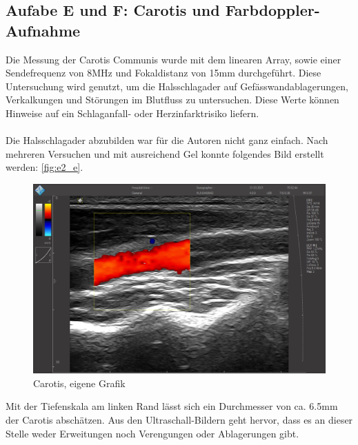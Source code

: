 \documentclass[11pt]{scrartcl}
\begin{document}

    \subsection{Aufabe E und F: Carotis und Farbdoppler-Aufnahme}

    Die Messung der Carotis Communis wurde mit dem linearen Array, sowie einer Sendefrequenz von 8MHz und
    Fokaldistanz von 15mm durchgeführt.
    Diese Untersuchung wird genutzt, um die Halsschlagader auf Gefässwandablagerungen, Verkalkungen und Störungen im
    Blutfluss zu untersuchen.
    Diese Werte können Hinweise auf ein Schlaganfall- oder Herzinfarktrisiko liefern.\\\\

    Die Halsschlagader abzubilden war für die Autoren nicht ganz einfach.
    Nach mehreren Versuchen und mit ausreichend Gel konnte folgendes Bild erstellt werden:
    \autoref{fig:e2_e}.

    \begin{figure}[H]
        \centering
        \includegraphics[width=15cm]{images/E2_e}
        \caption{Carotis, eigene Grafik}
        \label{fig:e2_e}
    \end{figure}

    Mit der Tiefenskala am linken Rand lässt sich ein Durchmesser von ca. 6.5mm der Carotis abschätzen.
    Aus den Ultraschall-Bildern geht hervor, dass es an dieser Stelle weder Erweitungen noch Verengungen
    oder Ablagerungen gibt.



\end{document}
